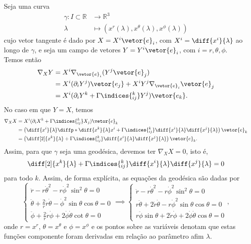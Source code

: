 Seja uma curva
\begin{align*}
    \gamma : I \subset \mathbb{R} &\to \mathbb{R}^3\\
                          \lambda &\mapsto \left(x^r(\lambda), x^\theta(\lambda), x^\phi(\lambda)\right)
\end{align*}
cujo vetor tangente é dado por \(X = X^i \vetor{e}_i\), com \(X^i = \diff{x^i}{\lambda}\) ao longo de \(\gamma\), e seja um campo de vetores \(Y = Y^i \vetor{e}_i\), com \(i = r, \theta, \phi\). Temos então
\begin{align*}
    \nabla_X Y &= X^i \nabla_{\vetor{e}_i} (Y^j \vetor{e}_j)\\
               &= X^i (\partial_{i}Y^j) \vetor{e_j} + X^iY^j\nabla_{\vetor{e}_i}\vetor{e}_j\\
               &= X^i (\partial_{i}Y^k + \Gamma\indices{^k_{ij}}Y^j)\vetor{e_k}.
\end{align*}
No caso em que \(Y = X\), temos
\begin{align*}
    \nabla_X X &= X^i (\partial_i X^k + \Gamma\indices{^k_{ij}}X_j)\vetor{e}_k\\
               &= \left(\diff{x^i}{\lambda} \diffp*{\diff{x^k}{\lambda}}{x^i} + \Gamma\indices{^k_{ij}}\diff{x^i}{\lambda}\diff{x^j}{\lambda}\right)\vetor{e}_k\\
               &= \left(\diff[2]{x^k}{\lambda} + \Gamma\indices{^k_{ij}}\diff{x^i}{\lambda}\diff{x^j}{\lambda}\right)\vetor{e}_k.
\end{align*}
Assim, para que \(\gamma\) seja uma geodésica, devemos ter \(\nabla_X X = 0\), isto é,
\begin{equation*}
   \diff[2]{x^k}{\lambda} + \Gamma\indices{^k_{ij}}\diff{x^i}{\lambda}\diff{x^j}{\lambda} = 0
\end{equation*}
para todo \(k\). Assim, de forma explícita, as equações da geodésica são dadas por
\begin{equation*}
    \begin{cases}
        \ddot{r} - r\dot{\theta}^2 -r\dot{\phi}^2 \sin^2\theta = 0\\
        \ddot{\theta} + \frac2r \dot{r}\dot{\theta} - \dot{\phi}^2\sin\theta\cos\theta=0\\
        \ddot{\phi} + \frac2r \dot{r}\dot{\phi} + 2\dot\phi\dot\theta \cot\theta = 0
    \end{cases} \implies
    \begin{cases}
        \ddot{r} - r\dot{\theta}^2 -r\dot{\phi}^2 \sin^2\theta = 0\\
        r\ddot{\theta} + 2\dot{r}\dot{\theta} - r\dot{\phi}^2\sin\theta\cos\theta=0\\
        r\ddot{\phi}\sin\theta + 2\dot{r}\dot{\phi} + 2\dot\phi\dot\theta \cos\theta = 0
    \end{cases},
\end{equation*}
onde \(r = x^r\), \(\theta = x^\theta\) e \(\phi = x^\phi\) e os pontos sobre as variáveis denotam que estas funções componente foram derivadas em relação ao parâmetro afim \(\lambda\).

